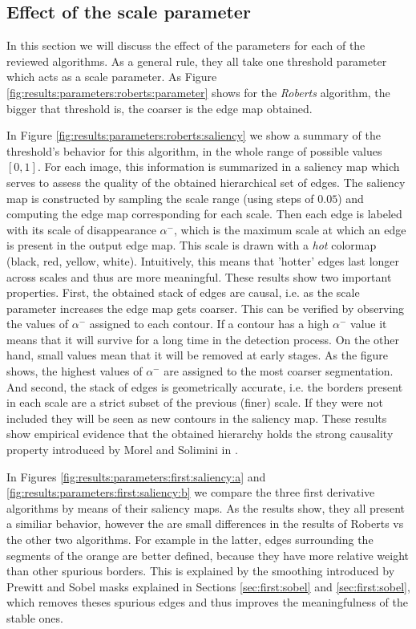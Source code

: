 \documentclass{ipol}
\numberwithin{equation}{section}
\numberwithin{table}{section}
\begin{document}
\subsection{Effect of the scale parameter}
\myn{\label{results:parameter:scale}}In this section we will discuss the effect of the parameters for each of the reviewed algorithms. As a general rule, they all take one threshold parameter which acts as a scale parameter. As Figure \ref{fig:results:parameters:roberts:parameter} shows for the \emph{Roberts} algorithm, the bigger that threshold is, the coarser is the edge map obtained.

In Figure \ref{fig:results:parameters:roberts:saliency} we show a summary of the threshold's behavior for this algorithm, in the whole range of possible values $[0,1]$. For each image, this information is summarized in a saliency map which serves to assess the quality of the obtained hierarchical set of edges.
The saliency map is constructed by sampling the scale range (using steps of $0.05$) and computing the edge map corresponding for each scale. Then each edge is labeled with its scale of disappearance $\alpha^-$, which is the maximum scale at which an edge is present in the output edge map. This scale is drawn with a \emph{hot} colormap (black, red, yellow, white). Intuitively, this means that 'hotter' edges last longer across scales and thus are more meaningful.
These results show two important properties. First, the obtained stack of edges are causal, i.e. as the scale parameter increases the edge map gets coarser. This can be verified by observing the values of $\alpha^-$ assigned to each contour.
If a contour has a high $\alpha^-$ value it means that it will survive for a long time in the detection process. On the other hand, small values mean that it will be removed at early stages.
As the figure shows, the highest values of $\alpha^-$ are assigned to the most coarser segmentation.
And second, the stack of edges is geometrically accurate, i.e. the borders present in each scale are a strict subset of the previous (finer) scale. If they were not included they will be seen as new contours in the saliency map.
These results show empirical evidence that the obtained hierarchy holds the strong causality property introduced by Morel and Solimini in \cite{book:morel:95:variational_pde}.

In Figures \ref{fig:results:parameters:first:saliency:a} and \ref{fig:results:parameters:first:saliency:b} we compare the three first derivative algorithms by means of their saliency maps. As the results show, they all present a similiar behavior, however the are small differences in the results of Roberts vs the other two algorithms. For example in the latter, edges surrounding the segments of the orange are better defined, because they have more relative weight than other spurious borders. This is explained by the smoothing introduced by Prewitt and Sobel masks explained in Sections \ref{sec:first:sobel} and \ref{sec:first:sobel}, which removes theses spurious edges and thus improves the meaningfulness of the stable ones.
\end{document}

